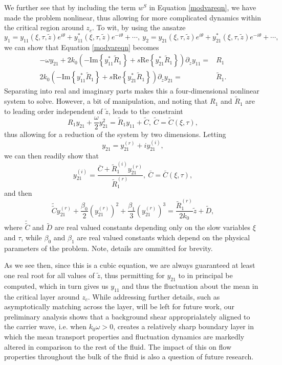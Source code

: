 \documentclass{JFM_Style/jfm}
\newcommand{\pd}{\partial}
\begin{document}
 We further see that by including the term $w^{S}$ in Equation \eqref{modvareqn}, we have made the problem nonlinear, thus allowing for more complicated dynamics within the critical region around $z_{c}$.  To wit, by using the ansatze 
 \[
 y_{1} = y_{11}(\xi,\tau,\tilde{z})e^{i\theta} + y_{11}^{\ast}(\xi,\tau,\tilde{z})e^{-i\theta} + \cdots, ~  y_{2} = y_{21}(\xi,\tau,\tilde{z})e^{i\theta} + y_{21}^{\ast}(\xi,\tau,\tilde{z})e^{-i\theta} + \cdots,
 \]
 we can show that Equation \eqref{modvareqn} becomes 
 \begin{align*}
 -\omega y_{21} + 2k_{0}\left(-\mbox{Im}\left\{y_{11}^{\ast}\tilde{R}_{1}\right\}+s\mbox{Re}\left\{y_{21}^{\ast}\tilde{R}_{1}\right\}\right)\pd_{\tilde{z}}y_{11} = & R_{1}\\
2k_{0}\left(-\mbox{Im}\left\{y_{11}^{\ast}\tilde{R}_{1}\right\}+s\mbox{Re}\left\{y_{21}^{\ast}\tilde{R}_{1}\right\}\right)\pd_{\tilde{z}}y_{21} = & \tilde{R}_{1}.
 \end{align*}
 Separating into real and imaginary parts makes this a four-dimensional nonlinear system to solve.  However, a bit of manipulation, and noting that $R_{1}$ and $\tilde{R}_{1}$ are to leading order independent of $\tilde{z}$, leads to the constraint
 \[
 R_{1}y_{21} + \frac{\omega}{2}y_{21}^{2} = \tilde{R}_{1}y_{11} + \tilde{C}, ~ \tilde{C} = \tilde{C}(\xi,\tau),
 \]
 thus allowing for a reduction of the system by two dimensions.  Letting 
 \[
 y_{21} = y_{21}^{(r)} + i y_{21}^{(i)},
 \]
 we can then readily show that 
 \[
 y^{(i)}_{21} = \frac{\bar{C} + \tilde{R}_{1}^{(i)}y_{21}^{(r)}}{\tilde{R}_{1}^{(r)}}, ~ \bar{C} = \bar{C}(\xi,\tau),
 \]
 and then 
 \[
 \tilde{\tilde{C}} y_{21}^{(r)} + \frac{\beta_{0}}{2}\left(y_{21}^{(r)}\right)^{2} + \frac{\beta_{1}}{3}\left(y_{21}^{(r)}\right)^{3} = \frac{\tilde{R}_{1}^{(r)}}{2k_{0}}\tilde{z} + \tilde{D},
 \]
where $\tilde{\tilde{C}}$ and $\tilde{D}$ are real valued constants depending only on the slow variables $\xi$ and $\tau$, while $\beta_{0}$ and $\beta_{1}$ are real valued constants which depend on the physical parameters of the problem.  Note, details are ommitted for brevity.  

As we see then, since this is a cubic equation, we are always guaranteed at least one real root for all values of $\tilde{z}$, thus permitting for $y_{21}$ to in principal be computed, which in turn gives us $y_{11}$ and thus the fluctuation about the mean in the critical layer around $z_{c}$.  While addressing further details, such as asymptotically matching across the layer, will be left for future work, our preliminary analysis shows that a background shear approprialately aligned to the carrier wave, i.e. when $k_{0}\omega >0$, creates a relatively sharp boundary layer in which the mean transport properties and fluctuation dynamics are markedly altered in comparison to the rest of the fluid.  The impact of this on flow properties throughout the bulk of the fluid is also a question of future research. 
\end{document}
